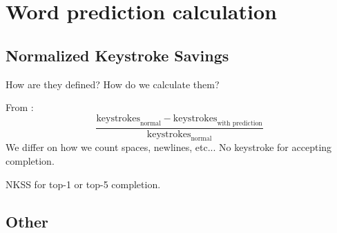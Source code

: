 %    
%    

\section{Word prediction calculation}
\label{sec:evaluation-topkjoin}

\subsection{Normalized Keystroke Savings}

\begin{draft}
How are they defined?
How do we calculate them?

From \textcite{Trnka2011}:
\begin{equation}
  \frac{\text{keystrokes}_\text{normal} - \text{keystrokes}_\text{with prediction}}
       {\text{keystrokes}_\text{normal}}
\end{equation}
We differ on how we count spaces, newlines, etc...
No keystroke for accepting completion.

NKSS for top-1 or top-5 completion.
\end{draft}

\subsection{Other}


